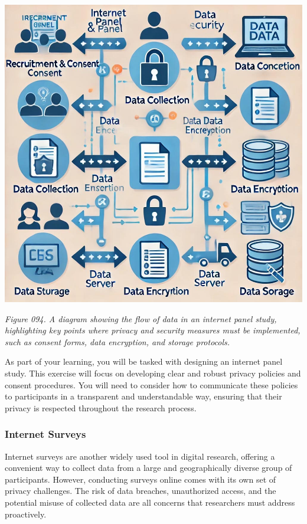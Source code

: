 \documentclass[
]{book}
\begin{document}
\includegraphics[width=1\textwidth,height=\textheight]{images/fig094.jpg}

\emph{Figure 094. A diagram showing the flow of data in an internet panel study, highlighting key points where privacy and security measures must be implemented, such as consent forms, data encryption, and storage protocols.}

As part of your learning, you will be tasked with designing an internet panel study. This exercise will focus on developing clear and robust privacy policies and consent procedures. You will need to consider how to communicate these policies to participants in a transparent and understandable way, ensuring that their privacy is respected throughout the research process.

\subsubsection{Internet Surveys}\label{internet-surveys}

Internet surveys are another widely used tool in digital research, offering a convenient way to collect data from a large and geographically diverse group of participants. However, conducting surveys online comes with its own set of privacy challenges. The risk of data breaches, unauthorized access, and the potential misuse of collected data are all concerns that researchers must address proactively.
\end{document}
